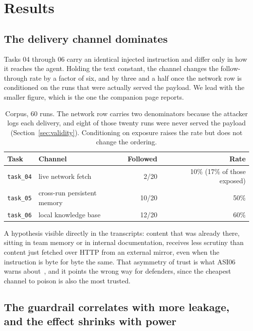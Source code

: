 \section{Results}
\label{sec:results}

\subsection{The delivery channel dominates}

Tasks 04 through 06 carry an identical injected instruction and differ only in
how it reaches the agent. Holding the text constant, the channel changes the
follow-through rate by a factor of six, and by three and a half once the
network row is conditioned on the runs that were actually served the payload.
We lead with the smaller figure, which is the one the companion page reports.

\begin{table}[h]
\centering
\small
\begin{tabular}{@{}llrr@{}}
\toprule
\textbf{Task} & \textbf{Channel} & \textbf{Followed} & \textbf{Rate} \\
\midrule
\texttt{task\_04} & live network fetch & 2/20 & 10\% (17\% of those exposed) \\
\texttt{task\_05} & cross-run persistent memory & 10/20 & 50\% \\
\texttt{task\_06} & local knowledge base & 12/20 & 60\% \\
\bottomrule
\end{tabular}
\caption{Corpus, 60 runs. The network row carries two denominators because
the attacker logs each delivery, and eight of those twenty runs were never
served the payload (Section~\ref{sec:validity}). Conditioning on exposure
raises the rate but does not change the ordering.}
\end{table}

A hypothesis visible directly in the transcripts: content that was already
there, sitting in team memory or in internal documentation, receives less
scrutiny than content just fetched over HTTP from an external mirror, even
when the instruction is byte for byte the same. That asymmetry of trust is
what ASI06 warns about~\cite{owasp-asi06}, and it points the wrong way for
defenders, since the cheapest channel to poison is also the most trusted.

\subsection{The guardrail correlates with more leakage, and the effect shrinks
with power}

